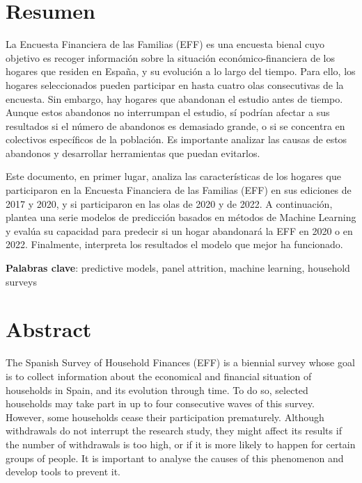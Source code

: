 
\chapter*{Resumen}

\onehalfspacing

La Encuesta Financiera de las Familias (EFF) es una encuesta bienal cuyo objetivo es recoger información sobre la situación económico-financiera de los hogares que residen en España, y su evolución a lo largo del tiempo. Para ello, los hogares seleccionados pueden participar en hasta cuatro olas consecutivas de la encuesta. Sin embargo, hay hogares que abandonan el estudio antes de tiempo. Aunque estos abandonos no interrumpan el estudio, sí podrían afectar a sus resultados si el número de abandonos es demasiado grande, o si se concentra en colectivos específicos de la población. Es importante analizar las causas de estos abandonos y desarrollar herramientas que puedan evitarlos.

Este documento, en primer lugar, analiza las características de los hogares que participaron en la Encuesta Financiera de las Familias (EFF) en sus ediciones de 2017 y 2020, y si participaron en las olas de 2020 y de 2022. A continuación, plantea una serie modelos de predicción basados en métodos de Machine Learning y evalúa su capacidad para predecir si un hogar abandonará la EFF en 2020 o en 2022. Finalmente, interpreta los resultados el modelo que mejor ha funcionado.

\vspace{1.5cm}

\textbf{Palabras clave}: predictive models, panel attrition, machine learning, household surveys

\chapter*{Abstract}

\onehalfspacing

The Spanish Survey of Household Finances (EFF) is a biennial survey whose goal is to collect information about the economical and financial situation of households in Spain, and its evolution through time. To do so, selected households may take part in up to four consecutive waves of this survey. However, some households cease their participation prematurely. Although withdrawals do not interrupt the research study, they might affect its results if the number of withdrawals is too high, or if it is more likely to happen for certain groups of people. It is important to analyse the causes of this phenomenon and develop tools to prevent it.

